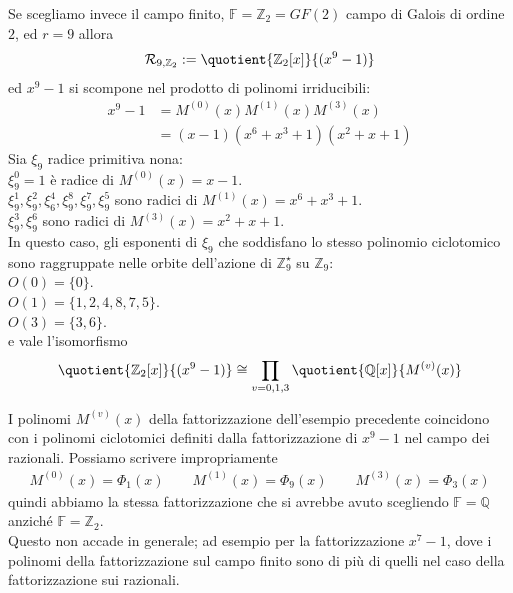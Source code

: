 \begin{esempio} \label{ese:fattor2_9}
Se scegliamo invece il campo finito,
$\mathbb{F} = \mathbb{Z}_{2} = GF(2)$ campo di Galois di ordine $2$, ed
$r = 9$ allora
\begin{align*}
  \mathcal{R}_{9, \mathbb{Z}_{2}}
       := \quotient{\mathbb{Z}_{2} \lbrack x \rbrack  }{(x^{9} - 1)}
\end{align*}
ed $x^{9}-1$ si scompone nel prodotto di polinomi irriducibili:
\begin{align*}
  x^9 - 1 &= M^{(0)}(x) M^{(1)}(x) M^{(3)}(x) \\
          &= (x-1)(x^6+x^3+1)(x^2+x+1)
\end{align*}
Sia $\xi_{9}$ radice primitiva nona:\\
$\xi_{9}^{0} = 1$ è radice di $M^{(0)}(x)= x-1$.\\
$\xi_{9}^{1},\xi_{9}^{2}, \xi_{6}^{4}, \xi_{9}^{8}, \xi_{9}^{7},\xi_{9}^{5} $
sono radici di $M^{(1)}(x) = x^6+x^3+1$.\\
$\xi_{9}^{3}, \xi_{9}^{6}$ sono radici di $M^{(3)}(x) = x^2+x+1$.\\
In questo caso, gli esponenti di $\xi_{9}$ che soddisfano lo
stesso polinomio ciclotomico sono raggruppate nelle orbite dell'azione di
$\mathbb{Z}_{9}^{\star}$ su $\mathbb{Z}_{9}$: \\
$O(0)= \lbrace 0 \rbrace$.\\
$O(1)= \lbrace 1,2,4,8,7,5 \rbrace$.\\
$O(3)= \lbrace 3,6 \rbrace$.\\
e vale l'isomorfismo
\begin{align*}
\quotient{\mathbb{Z}_{2} \lbrack x \rbrack  }{(x^{9} - 1)}
\cong
\prod_{v = 0,1,3} \quotient{\mathbb{Q} \lbrack x \rbrack  }{M^{(v)}(x)}
\end{align*}
\end{esempio}

I polinomi $M^{(v)}(x)$ della fattorizzazione dell'esempio precedente coincidono
con i polinomi ciclotomici definiti dalla fattorizzazione di $x^9 - 1$ nel
campo dei razionali. Possiamo scrivere impropriamente
\begin{align*}
   M^{(0)}(x) = \Phi_{1}(x) \qquad M^{(1)}(x) = \Phi_{9}(x)
                            \qquad M^{(3)}(x) = \Phi_{3}(x)
\end{align*}
quindi abbiamo la stessa
fattorizzazione che si avrebbe avuto
scegliendo $\mathbb{F} = \mathbb{Q}$ anziché $\mathbb{F} = \mathbb{Z}_{2}$. \\
Questo non accade in generale; ad esempio per la fattorizzazione $x^7 - 1$,
dove i polinomi della fattorizzazione sul campo finito sono di più di quelli
nel caso della fattorizzazione sui razionali.

